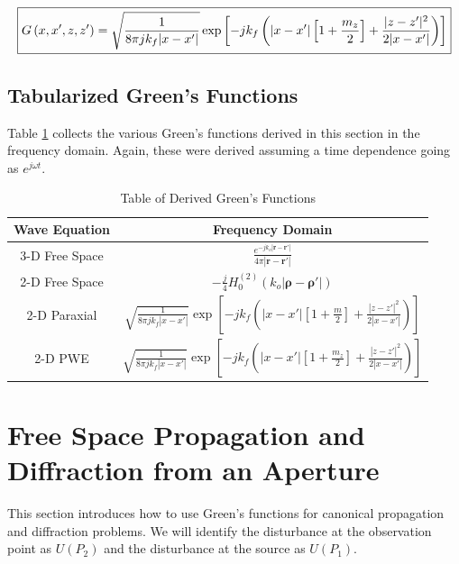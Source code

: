 \begin{equation}
\boxed{G\left(x,x',z,z' \right)= \sqrt{\frac{1}{8\pi jk_f|x-x'|}}\exp\left[-jk_f\left(|x-x'|\left[1+\frac{m_z}{2}\right] + \frac{|z-z'|^2}{2|x-x'|}\right) \right]}\\
\label{gf_eq:202}
\end{equation}
 \renewcommand{\baselinestretch}{2} \small\normalsize

\subsection {Tabularized Green's Functions}
Table \ref{gf_tab:0} collects the various Green's functions derived in this section in the frequency domain. Again, these were derived assuming a time dependence going as $e^{j\omega t}$.
\begin{table}[ht]
  \begin{center}
      \renewcommand{\baselinestretch}{1} \small\normalsize
  \begin{quote}
    \caption[Table of Derived Green's Functions]{Table of Derived Green's Functions\label{gf_tab:0}}
  \end{quote}
  \begin{tabular} {|c | c |}
    \hline
  \bf{Wave Equation} & \bf{Frequency Domain} \\ \hline
  3-D Free Space & $\displaystyle\frac{e^{-jk_o|\mathbf{r} - \mathbf{r}'|}}{4\pi |\mathbf{r} - \mathbf{r}'|}$ \\ \hline
  2-D Free Space & $\displaystyle -\frac{j}{4}H_0^{(2)}\left(k_o|\boldsymbol{\rho} - \boldsymbol{\rho}' | \right)$  \\ \hline
  2-D Paraxial & $\displaystyle\sqrt{\frac{1}{8\pi jk_f|x-x'|}}\exp\left[-jk_f\left(|x-x'|\left[1+\frac{m}{2}\right] + \frac{|z-z'|^2}{2|x-x'|}\right)\right]$\\ \hline
  2-D PWE &$\displaystyle\sqrt{\frac{1}{8\pi jk_f|x-x'|}}\exp\left[-jk_f\left(|x-x'|\left[1+\frac{m_z}{2}\right] + \frac{|z-z'|^2}{2|x-x'|}\right) \right]$ \\ \hline
\end{tabular}
\end{center}
\end{table}
\renewcommand{\baselinestretch}{2} \small\normalsize

\section {Free Space Propagation and Diffraction from an Aperture}
This section introduces how to use Green's functions for canonical propagation and diffraction problems. We will identify the disturbance at the observation point as $U(P_2)$ and the disturbance at the source as $U(P_1)$.


